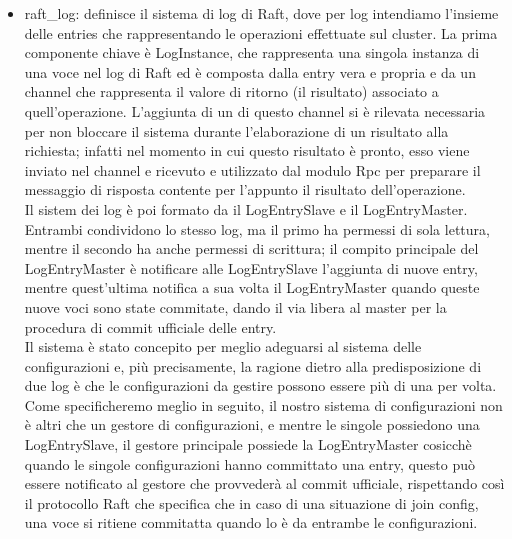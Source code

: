 \begin{itemize}
  \item raft\_log: definisce il sistema di log di Raft, dove per log intendiamo l'insieme delle entries che rappresentando le operazioni effettuate sul cluster. La prima componente chiave è LogInstance, che 
    rappresenta una singola instanza di una voce nel log di Raft ed è composta dalla entry vera e propria e da un channel che rappresenta il valore di ritorno (il risultato) associato a quell'operazione. L'aggiunta di un 
    di questo channel si è rilevata necessaria per non bloccare il sistema durante l'elaborazione di un risultato alla richiesta; infatti nel momento in cui questo risultato è pronto, esso viene inviato nel channel e ricevuto e 
    utilizzato dal modulo Rpc per preparare il messaggio di risposta contente per l'appunto il risultato dell'operazione. \\
    Il sistem dei log è poi formato da il LogEntrySlave e il LogEntryMaster. Entrambi condividono lo stesso log, ma il primo ha permessi di sola lettura, mentre il secondo ha anche permessi di scrittura; il compito principale 
    del LogEntryMaster è notificare alle LogEntrySlave l'aggiunta di nuove entry, mentre quest'ultima notifica a sua volta il LogEntryMaster quando queste nuove voci sono state commitate, dando il via libera al master per la 
    procedura di commit ufficiale delle entry. \\
    Il sistema è stato concepito per meglio adeguarsi al sistema delle configurazioni e, più precisamente, la ragione dietro alla predisposizione di due log è che le configurazioni da gestire possono essere più di una per volta. 
    Come specificheremo meglio in seguito, il nostro sistema di configurazioni non è altri che un gestore di configurazioni, e mentre le singole possiedono una LogEntrySlave, il gestore principale possiede la LogEntryMaster 
    cosicchè quando le singole configurazioni hanno committato una entry, questo può essere notificato al gestore che provvederà al commit ufficiale, rispettando così il protocollo Raft che specifica che in caso di una situazione
    di join config, una voce si ritiene commitatta quando lo è da entrambe le configurazioni.


\end{itemize}
